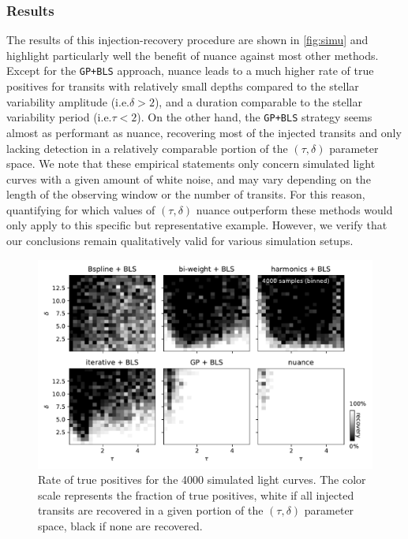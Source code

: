 \documentclass[modern,linenumbers]{aastex631}
\newcommand{\nuancecode}{\textsf{nuance}}
\begin{document}
\subsubsection*{Results}
The results of this injection-recovery procedure are shown in \autoref{fig:simu} and highlight particularly well the benefit of \textsf{nuance} against most other methods. Except for the \texttt{GP+BLS} approach, \nuancecode{} leads to a much higher rate of true positives for transits with relatively small depths compared to the stellar variability amplitude (i.e.\;$\delta>2$), and a duration comparable to the stellar variability period (i.e.\;$\tau<2$). On the other hand, the \texttt{GP+BLS} strategy seems almost as performant as \nuancecode, recovering most of the injected transits and only lacking detection in a relatively comparable portion of the $(\tau, \delta)$ parameter space. We note that these empirical statements only concern simulated light curves with a given amount of white noise, and may vary depending on the length of the observing window or the number of transits. For this reason, quantifying for which values of $(\tau, \delta)$ \textsf{nuance} outperform these methods would only apply to this specific but representative example. However, we verify that our conclusions remain qualitatively valid for various simulation setups.
\begin{figure}[H]
    \begin{centering}
        \includegraphics[width=\linewidth]{../workflows/synthetic-injection-recovery/figures/synthetic_ir.pdf}
        \caption{Rate of true positives for the 4000 simulated light curves. The color scale represents the fraction of true positives, white if all injected transits are recovered in a given portion of the $(\tau, \delta)$ parameter space, black if none are recovered.}
        \label{fig:simu}
    \end{centering}
\end{figure}
\end{document}
